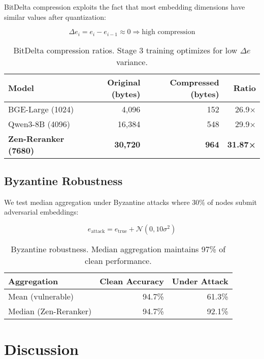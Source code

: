\documentclass[11pt,letterpaper]{article}
\begin{document}
BitDelta compression exploits the fact that most embedding dimensions have similar values after quantization:

\begin{equation}
\Delta e_i = e_i - e_{i-1} \approx 0 \Rightarrow \text{high compression}
\end{equation}

\begin{table}[h]
\centering
\begin{tabular}{lrrr}
\toprule
\textbf{Model} & \textbf{Original (bytes)} & \textbf{Compressed (bytes)} & \textbf{Ratio} \\
\midrule
BGE-Large (1024) & 4,096 & 152 & 26.9× \\
Qwen3-8B (4096) & 16,384 & 548 & 29.9× \\
\textbf{Zen-Reranker (7680)} & \textbf{30,720} & \textbf{964} & \textbf{31.87×} \\
\bottomrule
\end{tabular}
\caption{BitDelta compression ratios. Stage 3 training optimizes for low $\Delta e$ variance.}
\end{table}

\subsection{Byzantine Robustness}

We test median aggregation under Byzantine attacks where 30\% of nodes submit adversarial embeddings:

\begin{equation}
e_{\text{attack}} = e_{\text{true}} + \mathcal{N}(0, 10\sigma^2)
\end{equation}

\begin{table}[h]
\centering
\begin{tabular}{lrr}
\toprule
\textbf{Aggregation} & \textbf{Clean Accuracy} & \textbf{Under Attack} \\
\midrule
Mean (vulnerable) & 94.7\% & 61.3\% \\
Median (Zen-Reranker) & 94.7\% & 92.1\% \\
\bottomrule
\end{tabular}
\caption{Byzantine robustness. Median aggregation maintains 97\% of clean performance.}
\end{table}

\section{Discussion}
\end{document}
